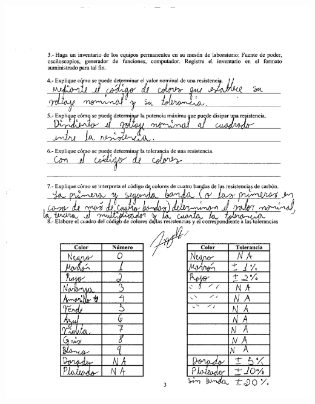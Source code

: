 \documentclass[12pt]{article}
\begin{document}
	\includegraphics[width=15cm,height=20cm]{anexo2}\\
	
\end{document}
